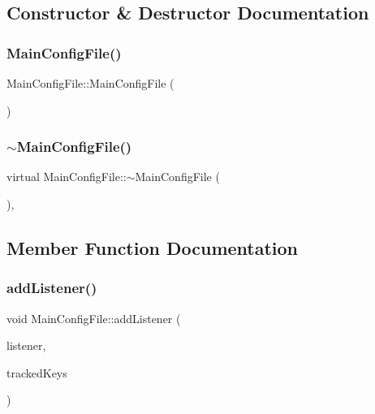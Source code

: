 \subsection{Constructor \& Destructor Documentation}
\mbox{\label{classMainConfigFile_af95264a153df021dc5113554d99d7ffa}} 
\subsubsection{\texorpdfstring{Main\+Config\+File()}{MainConfigFile()}}
{\footnotesize\ttfamily Main\+Config\+File\+::\+Main\+Config\+File (\begin{DoxyParamCaption}{ }\end{DoxyParamCaption})}

\mbox{\label{classMainConfigFile_a142bd2744550dc97ef0969da0db90e23}} 
\subsubsection{\texorpdfstring{$\sim$\+Main\+Config\+File()}{~MainConfigFile()}}
{\footnotesize\ttfamily virtual Main\+Config\+File\+::$\sim$\+Main\+Config\+File (\begin{DoxyParamCaption}{ }\end{DoxyParamCaption})\hspace{0.3cm}{\ttfamily [inline]}, {\ttfamily [virtual]}}



\subsection{Member Function Documentation}
\mbox{\label{classMainConfigFile_a1d1fa50851f5d896f728176a399401d8}} 
\subsubsection{\texorpdfstring{add\+Listener()}{addListener()}}
{\footnotesize\ttfamily void Main\+Config\+File\+::add\+Listener (\begin{DoxyParamCaption}\item[{\mbox{\hyperlink{classConfigFile_1_1Listener}{Config\+File\+::\+Listener}} $\ast$}]{listener,  }\item[{String\+Array}]{tracked\+Keys }\end{DoxyParamCaption})}

